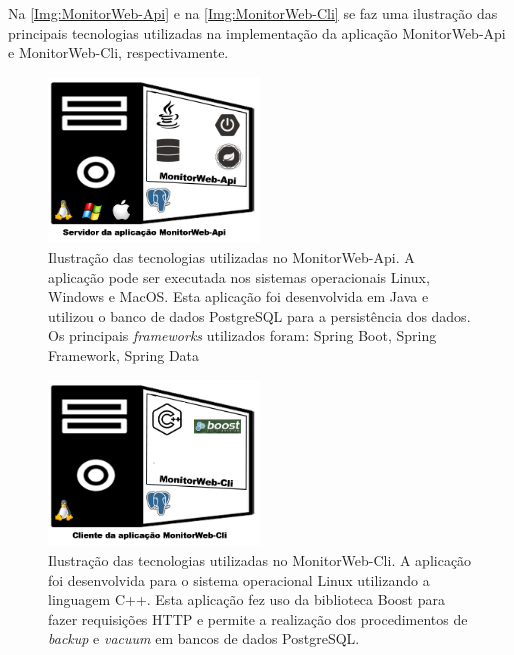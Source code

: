 Na \autoref{Img:MonitorWeb-Api} e na \autoref{Img:MonitorWeb-Cli} se faz uma ilustração das principais tecnologias utilizadas na implementação da aplicação MonitorWeb-Api e MonitorWeb-Cli, respectivamente.

\begin{figure}[H]
	\centering
	\includegraphics[width=0.5\textwidth]{figuras/MonitorWeb/monitorWeb-Api.jpg}
	\caption[Ilustração das tecnologias utilizadas no MonitorWeb-Api]{Ilustração das tecnologias utilizadas no MonitorWeb-Api. A aplicação pode ser executada nos sistemas operacionais Linux, Windows e MacOS. Esta aplicação foi desenvolvida em Java e utilizou o banco de dados PostgreSQL para a persistência dos dados. Os principais \textit{frameworks} utilizados foram: Spring Boot, Spring Framework, Spring Data}
	\label{Img:MonitorWeb-Api}
\end{figure}

\begin{figure}[H]
	\centering
	\includegraphics[width=0.5\textwidth]{figuras/MonitorWeb/monitorWeb-Cli.jpg}
	\caption[Ilustração das tecnologias utilizadas no MonitorWeb-Cli]{Ilustração das tecnologias utilizadas no MonitorWeb-Cli. A aplicação foi desenvolvida para o sistema operacional Linux utilizando a linguagem C++. Esta aplicação fez uso da biblioteca Boost para fazer requisições HTTP e permite a realização dos procedimentos de \textit{backup} e \textit{vacuum} em bancos de dados PostgreSQL.}
	\label{Img:MonitorWeb-Cli}
\end{figure}

